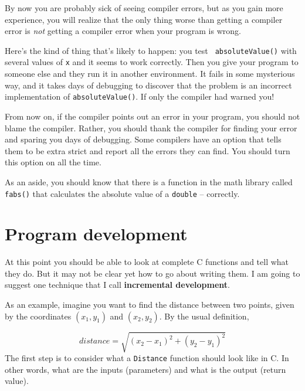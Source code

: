
By now you are probably sick of seeing compiler errors, but as you
gain more experience, you will realize that the only thing worse
than getting a compiler error is {\em not} getting a compiler error
when your program is wrong.

Here's the kind of thing that's likely to happen: you test {\tt
absoluteValue()} with several values of {\tt x} and it seems to work
correctly.  Then you give your program to someone else and they run it
in another environment.  It fails in some mysterious way, and it
takes days of debugging to discover that the problem is an
incorrect implementation of {\tt absoluteValue()}.  If only the
compiler had warned you!


From now on, if the compiler points out an error in your program, you
should not blame the compiler.  Rather, you should thank the compiler
for finding your error and sparing you days of debugging.  Some
compilers have an option that tells them to be extra strict and report
all the errors they can find.  You should turn this option on all the
time.


As an aside, you should know that there is a function in the
math library called {\tt fabs()} that calculates the absolute
value of a {\tt double} -- correctly.

\section{Program development}
\label{distance}

At this point you should be able to look at complete C functions
and tell what they do.  But it may not be clear yet how to go
about writing them.  I am going to suggest one technique that
I call {\bf incremental development}.


As an example, imagine you want to find the distance between two
points, given by the coordinates $(x_1, y_1)$ and $(x_2, y_2)$.  By
the usual definition,

\begin{equation}
distance = \sqrt{(x_2 - x_1)^2 + (y_2 - y_1)^2}
\end{equation}
%
The first step is to consider what a {\tt Distance} function
should look like in C.  In other words, what are the inputs
(parameters) and what is the output (return value).

